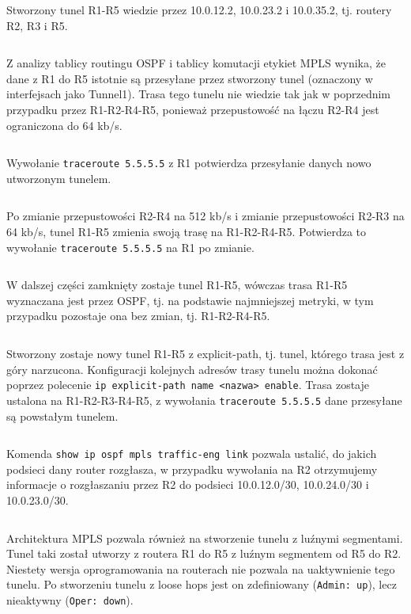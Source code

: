 \documentclass[a4paper,12pt,notitlepage]{article}
\begin{document}
Stworzony tunel R1-R5 wiedzie przez 10.0.12.2, 10.0.23.2 i 10.0.35.2, tj. routery R2, R3 i R5.
\inputminted[label=MPLS tunel R1-R5, firstline=309, lastline=357]{text}{R/R1.txt}

Z analizy tablicy routingu OSPF i tablicy komutacji etykiet MPLS wynika, że dane z R1 do R5 istotnie są przesyłane przez stworzony tunel (oznaczony w interfejsach jako Tunnel1). Trasa tego tunelu nie wiedzie tak jak w poprzednim przypadku przez R1-R2-R4-R5, ponieważ przepustowość na łączu R2-R4 jest ograniczona do 64 kb/s.
\inputminted[label=show ip route i show mpls forwarding-table dla R1, firstline=362, lastline=406]{text}{R/R1.txt}

Wywołanie \texttt{traceroute 5.5.5.5} z R1 potwierdza przesyłanie danych nowo utworzonym tunelem.
\inputminted[label=traceroute 5.5.5.5 z R1 po utworzeniu tunelu, firstline=407, lastline=414]{text}{R/R1.txt}

Po zmianie przepustowości R2-R4 na 512 kb/s i zmianie przepustowości R2-R3 na 64 kb/s, tunel R1-R5 zmienia swoją trasę na R1-R2-R4-R5. Potwierdza to wywołanie \texttt{traceroute 5.5.5.5} na R1 po zmianie.
\inputminted[label=traceroute 5.5.5.5 z R1 po zmianie przepustowości, firstline=425, lastline=432]{text}{R/R1.txt}

W dalszej części zamknięty zostaje tunel R1-R5, wówczas trasa R1-R5 wyznaczana jest przez OSPF, tj. na podstawie najmniejszej metryki, w tym przypadku pozostaje ona bez zmian, tj. R1-R2-R4-R5.
\inputminted[label=Zamknięcie tunelu R1-R5, firstline=439, lastline=472]{text}{R/R1.txt}

Stworzony zostaje nowy tunel R1-R5 z explicit-path, tj. tunel, którego trasa jest z góry narzucona. Konfiguracji kolejnych adresów trasy tunelu można dokonać poprzez polecenie \texttt{ip explicit-path name <nazwa> enable}. Trasa zostaje ustalona na R1-R2-R3-R4-R5, z wywołania \texttt{traceroute 5.5.5.5} dane przesyłane są powstałym tunelem.
\inputminted[label=Tunel R1-R5 z explicit-path R1-R2-R3-R4, firstline=521, lastline=538]{text}{R/R1.txt}

Komenda \texttt{show ip ospf mpls traffic-eng link} pozwala ustalić, do jakich podsieci dany router rozgłasza, w przypadku wywołania na R2 otrzymujemy informacje o rozgłaszaniu przez R2 do podsieci 10.0.12.0/30, 10.0.24.0/30 i 10.0.23.0/30.
\inputminted[label=show ip ospf mpls traffic-eng link na R2, firstline=456, lastline=508]{text}{R/R2.txt}

Architektura MPLS pozwala również na stworzenie tunelu z luźnymi segmentami. Tunel taki został utworzy z routera R1 do R5 z luźnym segmentem od R5 do R2. Niestety wersja oprogramowania na routerach nie pozwala na uaktywnienie tego tunelu. Po stworzeniu tunelu z loose hops jest on zdefiniowany (\texttt{Admin: up}), lecz nieaktywny (\texttt{Oper: down}).
\inputminted[label=Tunel R5-R1 z loose hops, firstline=1266, lastline=1295]{text}{R/R5.txt}
\end{document}
